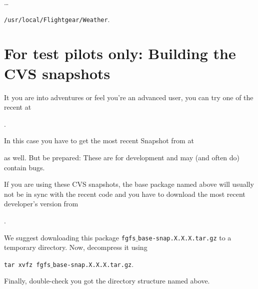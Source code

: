  \ldots

 \texttt{/usr/local/Flightgear/Weather}.


\section{For test pilots only: Building the CVS snapshots}

It you are into adventures or feel you're an advanced user, you can try one of the recent  at
  \medskip

.
 \medskip

 \noindent
In this case you have to get the most recent Snapshot from \SimGear{} at
 \medskip

 \medskip

 \noindent
 as well. But be prepared: These are for development and may (and often do)
contain bugs.

If you are using these CVS snapshots, the base package named above will usually not be
in sync with the recent code and you have to download the most recent developer's version
from
 \medskip

 .
 \medskip

\noindent
We suggest downloading this package \texttt{fgfs$\_$base-snap.X.X.X.tar.gz} to a temporary
directory. Now, decompress it using
\medskip

 \texttt{tar xvfz fgfs$\_$base-snap.X.X.X.tar.gz}.
 \medskip
 
Finally, double-check you got the directory structure named above.

